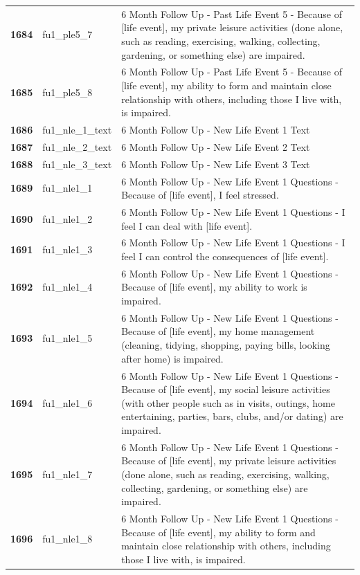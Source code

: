 \documentclass[
  letterpaper,
  DIV=11,
  numbers=noendperiod]{scrartcl}
\begin{document}
\begin{longtable}[t]{>{}cll}
\textbf{1684} & fu1\_ple5\_7 & 6 Month Follow Up - Past Life Event 5 - Because of [life event], my private leisure activities (done alone, such as reading, exercising, walking, collecting, gardening, or something else) are impaired.\\
\textbf{1685} & fu1\_ple5\_8 & 6 Month Follow Up - Past Life Event 5 - Because of [life event], my ability to form and maintain close relationship with others, including those I live with, is impaired.\\
\addlinespace
\textbf{1686} & fu1\_nle\_1\_text & 6 Month Follow Up - New Life Event 1 Text\\
\textbf{1687} & fu1\_nle\_2\_text & 6 Month Follow Up - New Life Event 2 Text\\
\textbf{1688} & fu1\_nle\_3\_text & 6 Month Follow Up - New Life Event 3 Text\\
\textbf{1689} & fu1\_nle1\_1 & 6 Month Follow Up - New Life Event 1 Questions - Because of [life event], I feel stressed.\\
\textbf{1690} & fu1\_nle1\_2 & 6 Month Follow Up - New Life Event 1 Questions - I feel I can deal with [life event].\\
\addlinespace
\textbf{1691} & fu1\_nle1\_3 & 6 Month Follow Up - New Life Event 1 Questions - I feel I can control the consequences of [life event].\\
\textbf{1692} & fu1\_nle1\_4 & 6 Month Follow Up - New Life Event 1 Questions - Because of [life event], my ability to work is impaired.\\
\textbf{1693} & fu1\_nle1\_5 & 6 Month Follow Up - New Life Event 1 Questions - Because of [life event], my home management (cleaning, tidying, shopping, paying bills, looking after home)  is impaired.\\
\textbf{1694} & fu1\_nle1\_6 & 6 Month Follow Up - New Life Event 1 Questions - Because of [life event], my social leisure activities (with other people such as in visits, outings, home entertaining, parties, bars, clubs, and/or dating) are impaired.\\
\textbf{1695} & fu1\_nle1\_7 & 6 Month Follow Up - New Life Event 1 Questions - Because of [life event], my private leisure activities (done alone, such as reading, exercising, walking, collecting, gardening, or something else) are impaired.\\
\addlinespace
\textbf{1696} & fu1\_nle1\_8 & 6 Month Follow Up - New Life Event 1 Questions - Because of [life event], my ability to form and maintain close relationship with others, including those I live with, is impaired.\\

\end{longtable}
\end{document}
